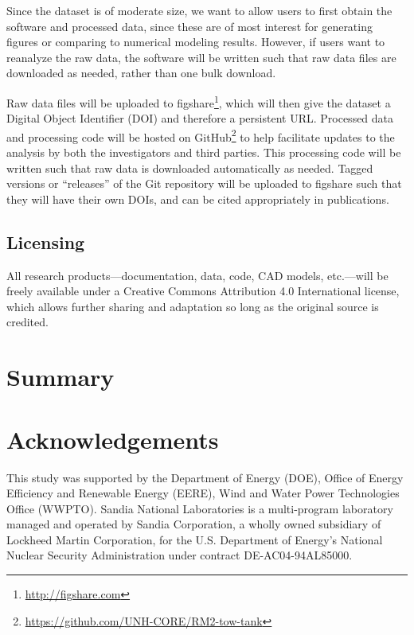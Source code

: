 \documentclass[12pt,letterpaper]{scrreprt}
\begin{document}
Since the dataset is of moderate size, we want to allow users to first
obtain the software and processed data, since these are of most interest for
generating figures or comparing to numerical modeling results. However, if users
want to reanalyze the raw data, the software will be written such that raw data
files are downloaded as needed, rather than one bulk download.

Raw data files will be uploaded to figshare\footnote{\url{http://figshare.com}},
which will then give the dataset a Digital Object Identifier (DOI) and therefore
a persistent URL. Processed data and processing code will be hosted on
GitHub\footnote{\url{https://github.com/UNH-CORE/RM2-tow-tank}} to help
facilitate updates to the analysis by both the investigators and third parties.
This processing code will be written such that raw data is downloaded
automatically as needed. Tagged versions or ``releases'' of the Git repository
will be uploaded to figshare such that they will have their own DOIs, and can be
cited appropriately in publications.

\section{Licensing} 

All research products---documentation, data, code, CAD models, etc.---will be
freely available under a Creative Commons Attribution 4.0 International license,
which allows further sharing and adaptation so long as the original source is
credited.


\chapter{Summary}



\chapter{Acknowledgements}

This study was supported by the Department of Energy (DOE), Office of Energy
Efficiency and Renewable Energy (EERE), Wind and Water Power Technologies Office
(WWPTO). Sandia National Laboratories is a multi-program laboratory managed and
operated by Sandia Corporation, a wholly owned subsidiary of Lockheed Martin
Corporation, for the U.S. Department of Energy's National Nuclear Security
Administration under contract DE-AC04-94AL85000.
\end{document}

